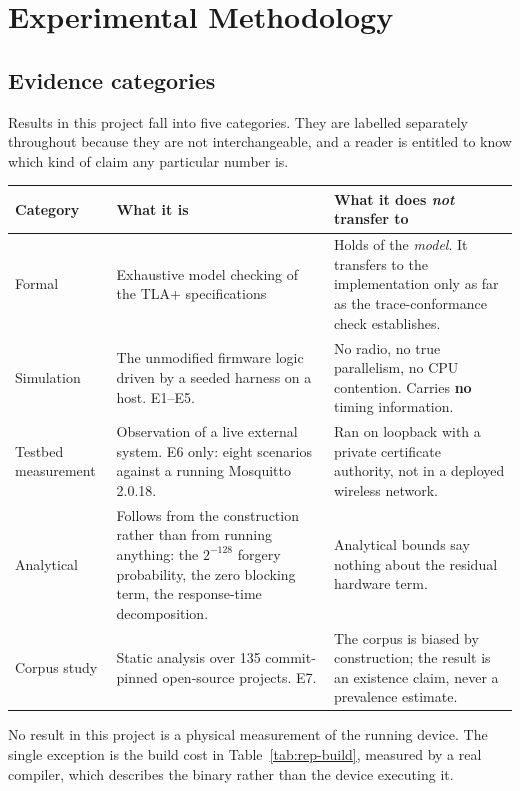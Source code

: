 \chapter{Experimental Methodology}\label{ch:method}

\section{Evidence categories}

Results in this project fall into five categories. They are labelled separately throughout
because they are not interchangeable, and a reader is entitled to know which kind of claim any
particular number is.

\begin{longtable}{@{}p{}p{}p{}@{}}
\toprule
\textbf{Category} & \textbf{What it is} & \textbf{What it does \emph{not} transfer to} \\
\midrule
\endhead
Formal & Exhaustive model checking of the TLA+ specifications & Holds of the \emph{model}. It
transfers to the implementation only as far as the trace-conformance check establishes. \\
Simulation & The unmodified firmware logic driven by a seeded harness on a host. E1--E5. &
No radio, no true parallelism, no CPU contention. Carries \textbf{no} timing information. \\
Testbed measurement & Observation of a live external system. E6 only: eight scenarios against
a running Mosquitto 2.0.18. & Ran on loopback with a private certificate authority, not in a
deployed wireless network. \\
Analytical & Follows from the construction rather than from running anything: the $2^{-128}$
forgery probability, the zero blocking term, the response-time decomposition. & Analytical
bounds say nothing about the residual hardware term. \\
Corpus study & Static analysis over 135 commit-pinned open-source projects. E7. & The corpus
is biased by construction; the result is an existence claim, never a prevalence estimate. \\
\bottomrule
\end{longtable}

No result in this project is a physical measurement of the running device. The single exception
is the build cost in Table~\ref{tab:rep-build}, measured by a real compiler, which describes the
binary rather than the device executing it.

